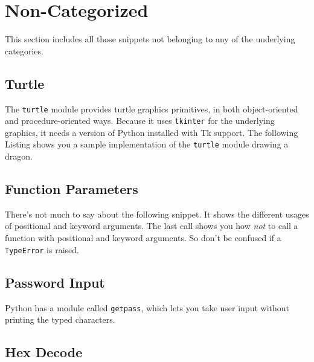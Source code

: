 
\section{Non-Categorized}

This section includes all those snippets not belonging to any of the underlying categories.


\subsection{Turtle}

The \lstinline{turtle} module provides turtle graphics primitives, in both object-oriented and procedure-oriented ways.
Because it uses \lstinline{tkinter} for the underlying graphics, it needs a version of Python installed with Tk support.
The following Listing shows you a sample implementation of the \lstinline{turtle} module drawing a dragon.




\subsection{Function Parameters}

There's not much to say about the following snippet.
It shows the different usages of positional and keyword arguments.
The last call shows you how \textit{not} to call a function with positional and keyword arguments.
So don't be confused if a \lstinline{TypeError} is raised.




\subsection{Password Input}

Python has a module called \lstinline{getpass}, which lets you take user input without printing the typed characters.




\subsection{Hex Decode}

